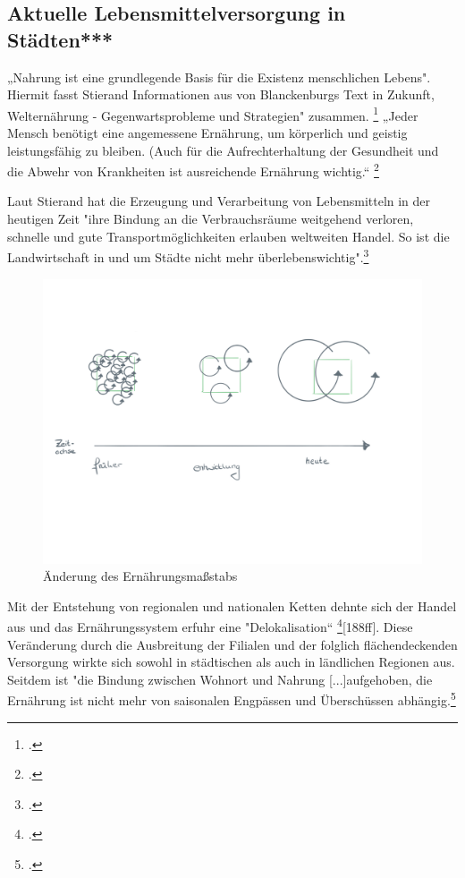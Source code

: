 \documentclass{scrartcl}
\begin{document}
\subsection{Aktuelle Lebensmittelversorgung in Städten***} 

„Nahrung ist eine grundlegende Basis für die Existenz menschlichen Lebens". Hiermit fasst Stierand Informationen aus von Blanckenburgs Text in Zukunft, Welternährung - Gegenwartsprobleme und Strategien" zusammen. \footcite[S.122f]{Stierand2008StadtLebensmittel} „Jeder Mensch benötigt eine angemessene Ernährung, um körperlich und geistig leistungsfähig zu bleiben. (Auch für die Aufrechterhaltung der Gesundheit und die Abwehr von Krankheiten ist ausreichende Ernährung wichtig.“ \footcite{Blanckenburg1987ZukunftDie}

Laut Stierand hat die Erzeugung und Verarbeitung von Lebensmitteln in der heutigen Zeit "ihre Bindung an die Verbrauchsräume weitgehend verloren, schnelle und gute Transportmöglichkeiten erlauben weltweiten Handel. So ist die Landwirtschaft in und um Städte nicht mehr überlebenswichtig".\footcite[S.122f]{Stierand2008StadtLebensmittel} 

\begin{figure}[htbp]
\centering
\includegraphics[width=12cm]{image_folder/ernahrung.png}
\caption{Änderung des Ernährungsmaßstabs}
\label{fig:massstab}
\end{figure}

Mit der Entstehung von regionalen und nationalen Ketten dehnte sich der Handel aus und das Ernährungssystem erfuhr eine "Delokalisation“ \footcite{MASSIMOMONTANARI1993DerEuropa}[188ff]. Diese Veränderung durch die Ausbreitung der Filialen und der folglich flächendeckenden Versorgung wirkte sich sowohl in städtischen als auch in ländlichen Regionen aus. Seitdem ist "die Bindung zwischen Wohnort und Nahrung [...]aufgehoben, die Ernährung ist nicht mehr von saisonalen Engpässen und Überschüssen abhängig.\footcite{Stierand2008StadtLebensmittel, S.122f}  
\end{document}
